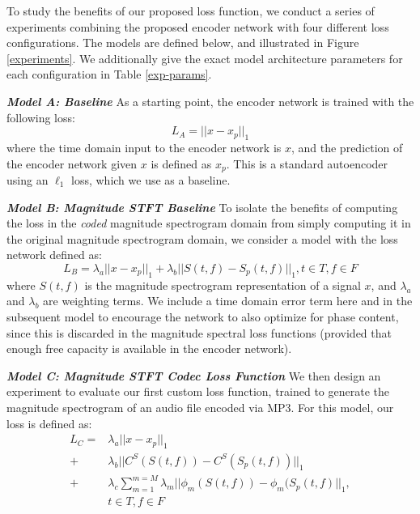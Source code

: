 \documentclass[sigconf]{acmart}
\begin{document}
To study the benefits of our proposed loss function, we conduct a series of experiments combining the proposed encoder network with four different loss configurations.  The models are defined below, and illustrated in Figure \ref{experiments}.  We additionally give the exact model architecture parameters for each configuration in Table \ref{exp-params}.

\textit{\textbf{Model A: Baseline}}
As a starting point, the encoder network is trained with the following loss:
\begin{equation}
    L_{A} = ||x - x_{p}||_{1}
\end{equation}
where the time domain input to the encoder network is $x$, and the prediction of the encoder network given $x$ is defined as $x_{p}$. This is a standard autoencoder using an $\ell_1$ loss, which we use as a baseline.

\textit{\textbf{Model B: Magnitude STFT Baseline}}
To isolate the benefits of computing the loss in the \textit{coded} magnitude spectrogram domain from simply computing it in the original magnitude spectrogram domain, we consider a model with the loss network defined as:
\begin{equation}
    L_{B} = \lambda_{a}||x - x_{p}||_{1} + \lambda_{b}||S(t,f) - S_{p}(t,f)||_{1}, t \in T, f \in F
\end{equation}
where $S(t,f)$ is the magnitude spectrogram representation of a signal $x$, and $\lambda_{a}$ and $\lambda_{b}$ are weighting terms. We include a time domain error term here and in the subsequent model to encourage the network to also optimize for phase content, since this is discarded in the magnitude spectral loss functions (provided that enough free capacity is available in the encoder network).

\textit{\textbf{Model C: Magnitude STFT Codec Loss Function}}
We then design an experiment to evaluate our first custom loss function, trained to generate the magnitude spectrogram of an audio file encoded via MP3.  For this model, our loss is defined as:
\begin{equation}
    \begin{aligned}
        L_{C} = & \lambda_{a}||x - x_{p}||_{1} \\
        + & \lambda_{b}||C^{S}(S(t,f)) - C^{S}(S_{p}(t,f))||_{1} \\
        + & \lambda_{c}\sum_{m=1}^{m=M} \lambda_{m}||\phi_{m}(S(t,f)) - \phi_{m}(S_{p}(t,f) ||_{1},\\
        & t \in T, f \in F
    \end{aligned}
\end{equation}
\end{document}
